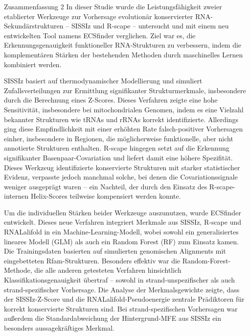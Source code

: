 \documentclass{article}
\begin{document}
\begin{large}
\begin{large}
\begin{large}
Zusammenfassung 2
In dieser Studie wurde die Leistungsfähigkeit zweier etablierter Werkzeuge zur Vorhersage evolutionär konservierter RNA-Sekundärstrukturen – SISSIz und R-scape – untersucht und mit einem neu entwickelten Tool namens ECSfinder verglichen. Ziel war es, die Erkennungsgenauigkeit funktioneller RNA-Strukturen zu verbessern, indem die komplementären Stärken der bestehenden Methoden durch maschinelles Lernen kombiniert werden.

SISSIz basiert auf thermodynamischer Modellierung und simuliert Zufallsverteilungen zur Ermittlung signifikanter Strukturmerkmale, insbesondere durch die Berechnung eines Z-Scores. Dieses Verfahren zeigte eine hohe Sensitivität, insbesondere bei mitochondrialen Genomen, indem es eine Vielzahl bekannter Strukturen wie tRNAs und rRNAs korrekt identifizierte. Allerdings ging diese Empfindlichkeit mit einer erhöhten Rate falsch-positiver Vorhersagen einher, insbesondere in Regionen, die möglicherweise funktionelle, aber nicht annotierte Strukturen enthalten. R-scape hingegen setzt auf die Erkennung signifikanter Basenpaar-Covariation und liefert damit eine höhere Spezifität. Dieses Werkzeug identifizierte konservierte Strukturen mit starker statistischer Evidenz, verpasste jedoch manchmal solche, bei denen die Covariationssignale weniger ausgeprägt waren – ein Nachteil, der durch den Einsatz des R-scape-internen Helix-Scores teilweise kompensiert werden konnte.

Um die individuellen Stärken beider Werkzeuge auszunutzen, wurde ECSfinder entwickelt. Dieses neue Verfahren integriert Merkmale aus SISSIz, R-scape und RNALalifold in ein Machine-Learning-Modell, wobei sowohl ein generalisiertes lineares Modell (GLM) als auch ein Random Forest (RF) zum Einsatz kamen. Die Trainingsdaten basierten auf simulierten genomischen Alignments mit eingebetteten Rfam-Strukturen. Besonders effektiv war die Random-Forest-Methode, die alle anderen getesteten Verfahren hinsichtlich Klassifikationsgenauigkeit übertraf – sowohl in strand-unspezifischer als auch strand-spezifischer Vorhersage. Die Analyse der Merkmalsgewichte zeigte, dass der SISSIz-Z-Score und die RNALalifold-Pseudoenergie zentrale Prädiktoren für korrekt konservierte Strukturen sind. Bei strand-spezifischen Vorhersagen war außerdem die Standardabweichung der Hintergrund-MFE aus SISSIz ein besonders aussagekräftiges Merkmal.


\end{large}
\end{large}
\end{large}
\end{document}
